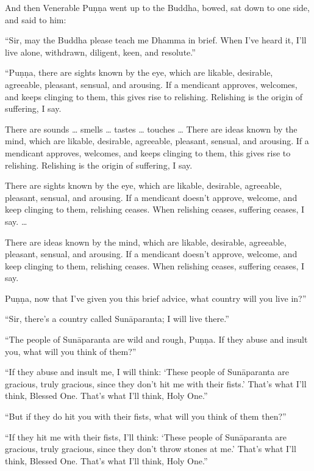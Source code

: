 \documentclass[12pt,openany]{book}%
\begin{document}
And then Venerable \textsanskrit{Puṇṇa} went up to the Buddha, bowed, sat down to one side, and said to him: 

“Sir, may the Buddha please teach me Dhamma in brief. When I’ve heard it, I’ll live alone, withdrawn, diligent, keen, and resolute.” 

“\textsanskrit{Puṇṇa}, there are sights known by the eye, which are likable, desirable, agreeable, pleasant, sensual, and arousing. If a mendicant approves, welcomes, and keeps clinging to them, this gives rise to relishing. Relishing is the origin of suffering, I say. 

There are sounds … smells … tastes … touches … There are ideas known by the mind, which are likable, desirable, agreeable, pleasant, sensual, and arousing. If a mendicant approves, welcomes, and keeps clinging to them, this gives rise to relishing. Relishing is the origin of suffering, I say. 

There are sights known by the eye, which are likable, desirable, agreeable, pleasant, sensual, and arousing. If a mendicant doesn’t approve, welcome, and keep clinging to them, relishing ceases. When relishing ceases, suffering ceases, I say. … 

There are ideas known by the mind, which are likable, desirable, agreeable, pleasant, sensual, and arousing. If a mendicant doesn’t approve, welcome, and keep clinging to them, relishing ceases. When relishing ceases, suffering ceases, I say. 

\textsanskrit{Puṇṇa}, now that I’ve given you this brief advice, what country will you live in?” 

“Sir, there’s a country called \textsanskrit{Sunāparanta}; I will live there.” 

“The people of \textsanskrit{Sunāparanta} are wild and rough, \textsanskrit{Puṇṇa}. If they abuse and insult you, what will you think of them?” 

“If they abuse and insult me, I will think: ‘These people of \textsanskrit{Sunāparanta} are gracious, truly gracious, since they don’t hit me with their fists.’ That’s what I’ll think, Blessed One. That’s what I’ll think, Holy One.” 

“But if they do hit you with their fists, what will you think of them then?” 

“If they hit me with their fists, I’ll think: ‘These people of \textsanskrit{Sunāparanta} are gracious, truly gracious, since they don’t throw stones at me.’ That’s what I’ll think, Blessed One. That’s what I’ll think, Holy One.” 
\end{document}
